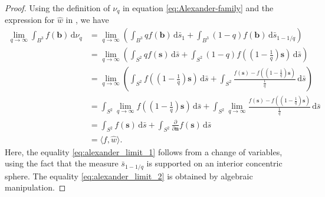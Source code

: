 \documentclass[a4paper, oneside, reqno]{amsart}
\theoremstyle{definition}
\theoremstyle{remark}
\numberwithin{equation}{section}
\renewcommand{\vec}{\mathbf}
\newcommand{\dd}{\mathrm{d}} %
\newcommand{\dispair}[2]{\langle #2,#1 \rangle}
\begin{document}
\begin{proof}
Using the definition of \(\nu_q\) in equation \eqref{eq:Alexander-family} and the expression for \(\widehat{w}\) in , we have
    \begin{align}
        \lim_{q\to \infty}
            \int_{B^3} f(\vec{b}) \,\dd \nu_q 
        \nonumber 
        &=
        \lim_{q\to \infty}
        \left(
            \int_{B^3} q f(\vec{b})  \,\dd \bar{s}_1 
            + 
            \int_{B^3} (1 - q)f(\vec{b}) \,\dd\bar{s}_{1-1/q}
        \right)
        \nonumber \\
        &=
        \lim_{q\to \infty}
        \left(
            \int_{S^2} q f(\vec{s})\,\dd \bar{s} 
            + 
            \int_{S^2} (1 - q) f\left(\left(1-\tfrac{1}{q}\right)\vec{s}\right)\,\dd\bar{s}
        \right)
        \label{eq:alexander_limit_1} \\
        &=
        \lim_{q\to \infty}
        \left(
            \int_{S^2} f\left(\left(1-\tfrac{1}{q}\right)\vec{s}\right) \,\dd \bar{s} 
            + 
            \int_{S^2} \frac{f(\vec{s}) - f\left(\left(1-\tfrac{1}{q}\right)\vec{s}\right)}{\tfrac{1}{q}} \,\dd\bar{s}
        \right)
        \label{eq:alexander_limit_2} \\
        &=
        \int_{S^2} \lim_{q\to \infty} f\left(\left(1-\tfrac{1}{q}\right)\vec{s}\right) \,\dd \bar{s} 
        + 
        \int_{S^2} \lim_{q\to \infty} \frac{f(\vec{s}) - f\left(\left(1-\tfrac{1}{q}\right)\vec{s}\right)}{\tfrac{1}{q}} \,\dd\bar{s}
        \label{eq:alexander_limit_3} \\
        &=
        \int_{S^2} f(\vec{s}) \,\dd \bar{s}
        +
        \int_{S^2} \tfrac{\partial}{\partial \vec{n}} f(\vec{s}) \,\dd \bar{s}
        \label{eq:alexander_limit_4} \\
        &=
        \dispair{\widehat{w}}{f}.
        \nonumber 
    \end{align}
Here, the equality \eqref{eq:alexander_limit_1} follows from a change of variables, using the fact that the measure \(\bar s_{1-1/q}\) is supported on an interior concentric sphere. The equality \eqref{eq:alexander_limit_2} is obtained by algebraic manipulation.


\end{proof}
\end{document}
